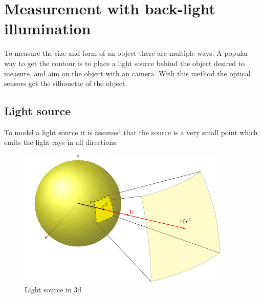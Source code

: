 \section{Measurement with back-light illumination}
To measure the size and form of an object there are multiple ways. A popular way to get the contour is to place a light source behind the object desired to measure, and aim on the object with an camera. With this method the optical sensors get the silhouette of the object. 
\subsection{Light source}
To model a light source it is assumed that the source is a very small point which emits the light rays in all directions. 

\begin{figure}[ht]
	\centering
	\includegraphics[width=0.9\textwidth]{2-theory/backlight/light.pdf}
	\caption{Light source in 3d\label{theory:light}}
\end{figure} 


